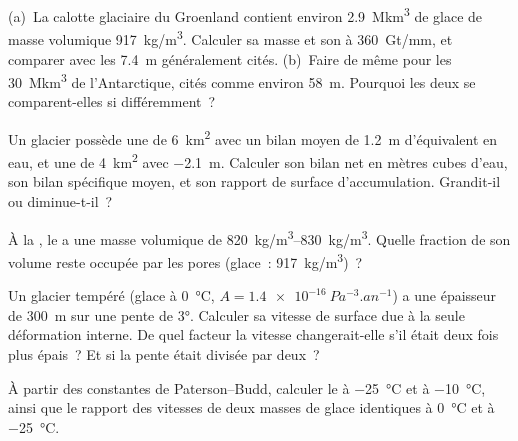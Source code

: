 \begin{exercise}[$\star$]\label{exo:b3:glaciology:2}
(a)~La calotte glaciaire du Groenland contient environ \qty{2.9}{\mega km^3} de glace de
masse volumique \qty{917}{kg/m^3}. Calculer sa masse et son  à
\qty{360}{Gt/mm}, et comparer avec les \qty{7.4}{m} généralement cités.
(b)~Faire de même pour les \qty{30}{\mega km^3} de l'Antarctique, cités comme environ
\qty{58}{m}. Pourquoi les deux se comparent-elles si différemment~?
\end{exercise}

\begin{exercise}[$\star$]\label{exo:b3:glaciology:3}
Un glacier possède une  de \qty{6}{km^2} avec un bilan moyen de
\qty{+1.2}{m} d'équivalent en eau, et une  de \qty{4}{km^2} avec
\qty{-2.1}{m}. Calculer son bilan net en mètres cubes d'eau, son bilan
spécifique moyen, et son rapport de surface d'accumulation. Grandit-il ou
diminue-t-il~?
\end{exercise}

\begin{exercise}[$\star$]\label{exo:b3:glaciology:4}
À la , le  a une masse volumique de \qtyrange{820}{830}{kg/m^3}.
Quelle fraction de son volume reste occupée par les pores (glace~:
\qty{917}{kg/m^3})~?
\end{exercise}

\begin{exercise}[$\star\star$]\label{exo:b3:glaciology:5}
Un glacier tempéré (glace à \qty{0}{\celsius}, $A =
\qty{1.4e-16}{Pa^{-3}.an^{-1}}$) a une épaisseur de \qty{300}{m} sur une pente de
\ang{3}. Calculer sa vitesse de surface due à la seule déformation interne. De quel
facteur la vitesse changerait-elle s'il était deux fois plus épais~? Et si la pente
était divisée par deux~?
\end{exercise}

\begin{exercise}[$\star\star$]\label{exo:b3:glaciology:6}
À partir des constantes de Paterson--Budd, calculer le  à
\qty{-25}{\celsius} et à \qty{-10}{\celsius}, ainsi que le rapport des vitesses de
deux masses de glace identiques à \qty{0}{\celsius} et à \qty{-25}{\celsius}.
\end{exercise}


